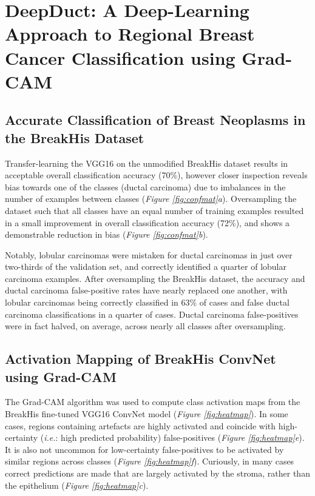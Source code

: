 \section{DeepDuct: A Deep-Learning Approach to Regional Breast Cancer Classification using Grad-CAM}

\subsection{Accurate Classification of Breast Neoplasms in the BreakHis Dataset}

Transfer-learning the VGG16 on the unmodified BreakHis dataset results in acceptable overall classification accuracy (70\%), however closer inspection reveals bias towards one of the classes (ductal carcinoma) due to imbalances in the number of examples between classes (\emph{Figure \ref{fig:confmat}a}). Oversampling the dataset such that all classes have an equal number of training examples resulted in a small improvement in overall classification accuracy (72\%), and shows a demonstrable reduction in bias (\emph{Figure \ref{fig:confmat}b}).\par

Notably, lobular carcinomas were mistaken for ductal carcinomas in just over two-thirds of the validation set, and correctly identified a quarter of lobular carcinoma examples. After oversampling the BreakHis dataset, the accuracy and ductal carcinoma false-positive rates have nearly replaced one another, with lobular carcinomas being correctly classified in 63\% of cases and false ductal carcinoma classifications in a quarter of cases. Ductal carcinoma false-positives were in fact halved, on average, across nearly all classes after oversampling.\par

\subsection{Activation Mapping of BreakHis ConvNet using \mbox{Grad-CAM}}

The Grad-CAM algorithm was used to compute class activation maps from the BreakHis fine-tuned VGG16 ConvNet model (\emph{Figure \ref{fig:heatmap}}). In some cases, regions containing artefacts are highly activated and coincide with high-certainty (\textit{i.e.}: high predicted probability) false-positives (\emph{Figure \ref{fig:heatmap}e}). It is also not uncommon for low-certainty false-positives to be activated by similar regions across classes (\emph{Figure \ref{fig:heatmap}f}). Curiously, in many cases correct predictions are made that are largely activated by the stroma, rather than the epithelium (\emph{Figure \ref{fig:heatmap}c}).



